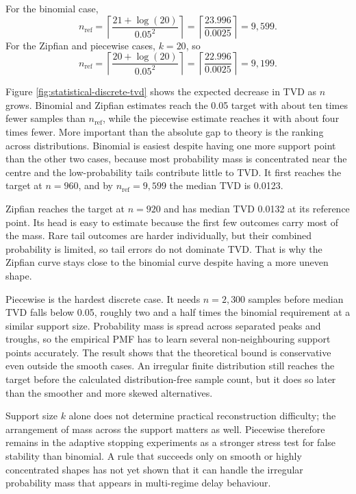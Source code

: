 \documentclass[a4paper,11pt]{report}
\begin{document}
For the binomial case,
\[
n_{\mathrm{ref}} =
\left\lceil \frac{21+\log(20)}{0.05^2} \right\rceil
=
\left\lceil \frac{23.996}{0.0025} \right\rceil
= 9{,}599.
\]
For the Zipfian and piecewise cases, \(k=20\), so
\[
n_{\mathrm{ref}} =
\left\lceil \frac{20+\log(20)}{0.05^2} \right\rceil
=
\left\lceil \frac{22.996}{0.0025} \right\rceil
= 9{,}199.
\]

Figure \ref{fig:statistical-discrete-tvd} shows the expected decrease in TVD as \(n\) grows. Binomial and Zipfian estimates reach the 0.05 target with about ten times fewer samples than \(n_{\mathrm{ref}}\), while the piecewise estimate reaches it with about four times fewer. More important than the absolute gap to theory is the ranking across distributions. Binomial is easiest despite having one more support point than the other two cases, because most probability mass is concentrated near the centre and the low-probability tails contribute little to TVD. It first reaches the target at \(n=960\), and by \(n_{\mathrm{ref}}=9{,}599\) the median TVD is 0.0123.

Zipfian reaches the target at \(n=920\) and has median TVD 0.0132 at its reference point. Its head is easy to estimate because the first few outcomes carry most of the mass. Rare tail outcomes are harder individually, but their combined probability is limited, so tail errors do not dominate TVD. That is why the Zipfian curve stays close to the binomial curve despite having a more uneven shape.

Piecewise is the hardest discrete case. It needs \(n=2{,}300\) samples before median TVD falls below 0.05, roughly two and a half times the binomial requirement at a similar support size. Probability mass is spread across separated peaks and troughs, so the empirical PMF has to learn several non-neighbouring support points accurately. The result shows that the theoretical bound is conservative even outside the smooth cases. An irregular finite distribution still reaches the target before the calculated distribution-free sample count, but it does so later than the smoother and more skewed alternatives.

Support size \(k\) alone does not determine practical reconstruction difficulty; the arrangement of mass across the support matters as well. Piecewise therefore remains in the adaptive stopping experiments as a stronger stress test for false stability than binomial. A rule that succeeds only on smooth or highly concentrated shapes has not yet shown that it can handle the irregular probability mass that appears in multi-regime delay behaviour.
\end{document}

